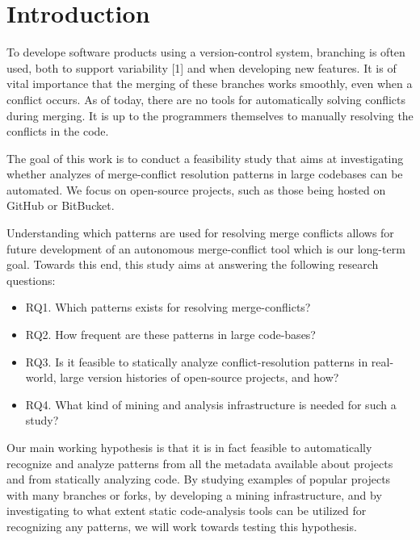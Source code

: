 \chapter{Introduction}
\setlength{\parindent}{0pt}
To develope software products using a version-control system, branching is often used, both to support variability [1] and when developing new features. It is of vital importance that the merging of these branches works smoothly, even when a conflict occurs. As of today, there are no tools for automatically solving conflicts during merging. It is up to the programmers themselves to manually resolving the conflicts in the code.

The goal of this work is to conduct a feasibility study that aims at investigating whether analyzes of merge-conflict resolution patterns in large codebases can be automated. We focus on open-source projects, such as those being hosted on GitHub or BitBucket.

Understanding which patterns are used for resolving merge conflicts allows for future development of an autonomous merge-conflict tool which is our long-term goal. Towards this end, this study aims at answering the following research questions:
\begin{itemize}
\item RQ1. Which patterns exists for resolving merge-conflicts?
\item RQ2. How frequent are these patterns in large code-bases?
\item RQ3. Is it feasible to statically analyze conflict-resolution patterns in real-world, large version histories of open-source projects, and how?
\item RQ4. What kind of mining and analysis infrastructure is needed for such a study?
\end{itemize}

Our main working hypothesis is that it is in fact feasible to automatically recognize and analyze patterns from all the metadata available about projects and from statically analyzing code. By studying examples of popular projects with many branches or forks, by developing a mining infrastructure, and by investigating to what extent static code-analysis tools can be utilized for recognizing any patterns, we will work towards testing this hypothesis.
